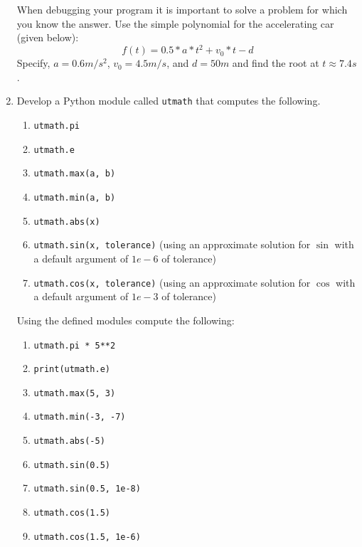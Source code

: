 \documentclass[a4paper,12pt]{article}
\begin{document}
\begin{enumerate}
	When debugging your program it is important to solve a problem for which you know the answer. Use the simple polynomial for the accelerating car (given below):
	\begin{equation*}
	f(t) = 0.5 * a * t^2 + v_0 * t - d
	\end{equation*}
	Specify, $a = 0.6m/s^2$, $v_0 = 4.5 m/s$, and $d=50m$ and find the root at $t\approx7.4s$.
	
	\item Develop a Python module called \verb|utmath| that computes the following.
	\begin{enumerate}
		\item \verb|utmath.pi|
		\item \verb|utmath.e|
		\item \verb|utmath.max(a, b)|
		\item \verb|utmath.min(a, b)|
		\item \verb|utmath.abs(x)|
		\item \verb|utmath.sin(x, tolerance)| (using an approximate solution for $\sin$ with a default argument of $1e-6$ of tolerance)
		\item \verb|utmath.cos(x, tolerance)| (using an approximate solution for $\cos$ with a default argument of $1e-3$ of tolerance)
	\end{enumerate}

	Using the defined modules compute the following:
	
	\begin{enumerate}
		\item \verb|utmath.pi * 5**2|
		\item \verb|print(utmath.e)|
		\item \verb|utmath.max(5, 3)|
		\item \verb|utmath.min(-3, -7)|
		\item \verb|utmath.abs(-5)|
		\item \verb|utmath.sin(0.5)|
		\item \verb|utmath.sin(0.5, 1e-8)|
		\item \verb|utmath.cos(1.5)|
		\item \verb|utmath.cos(1.5, 1e-6)|
	\end{enumerate}

\end{enumerate}
\end{document}
